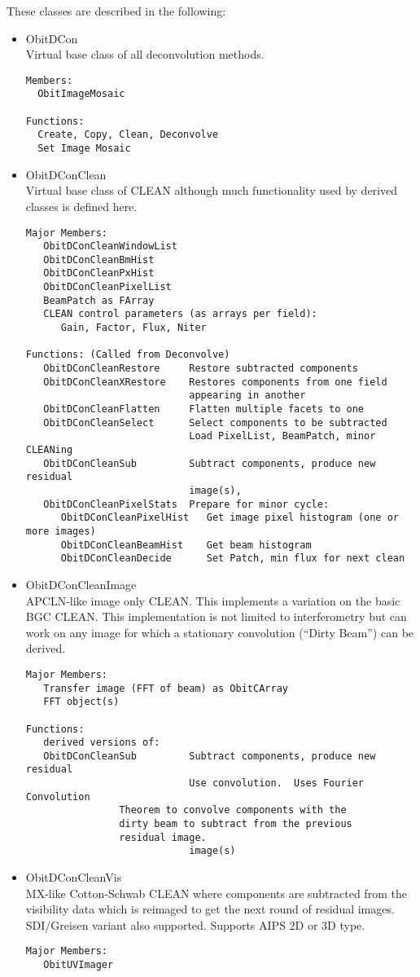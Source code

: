\documentclass[11pt]{article}
\begin{document}
These classes are described in the following:
\begin{itemize}
\item ObitDCon\\
Virtual base class of all deconvolution methods.
\begin{verbatim}
Members:
  ObitImageMosaic

Functions:
  Create, Copy, Clean, Deconvolve
  Set Image Mosaic
\end{verbatim}
\item ObitDConClean\\
Virtual base class of CLEAN although much functionality used by
derived classes is defined here.
\begin{verbatim}
Major Members:
   ObitDConCleanWindowList
   ObitDConCleanBmHist
   ObitDConCleanPxHist
   ObitDConCleanPixelList
   BeamPatch as FArray
   CLEAN control parameters (as arrays per field):
      Gain, Factor, Flux, Niter

Functions: (Called from Deconvolve)
   ObitDConCleanRestore     Restore subtracted components
   ObitDConCleanXRestore    Restores components from one field
                            appearing in another
   ObitDConCleanFlatten     Flatten multiple facets to one 
   ObitDConCleanSelect      Select components to be subtracted
                            Load PixelList, BeamPatch, minor CLEANing
   ObitDConCleanSub         Subtract components, produce new residual
                            image(s),
   ObitDConCleanPixelStats  Prepare for minor cycle:
      ObitDConCleanPixelHist   Get image pixel histogram (one or more images)
      ObitDConCleanBeamHist    Get beam histogram
      ObitDConCleanDecide      Set Patch, min flux for next clean
\end{verbatim}
\item ObitDConCleanImage\\
APCLN-like image only CLEAN.
This implements a variation on the basic BGC CLEAN.
This implementation is not limited to interferometry but can work on
any image for which a stationary convolution (``Dirty Beam'') can be
derived.
\begin{verbatim}
Major Members:
   Transfer image (FFT of beam) as ObitCArray
   FFT object(s)

Functions:
   derived versions of:
   ObitDConCleanSub         Subtract components, produce new residual
                            Use convolution.  Uses Fourier Convolution
			    Theorem to convolve components with the
			    dirty beam to subtract from the previous
			    residual image.
                            image(s)
\end{verbatim}
\item ObitDConCleanVis\\
MX-like Cotton-Schwab CLEAN where components are subtracted from the
visibility data which is reimaged to get the next round of residual
images. 
SDI/Greisen variant also supported.
Supports AIPS  2D or 3D  type.
\begin{verbatim}
Major Members:
   ObitUVImager


\end{verbatim}
\end{itemize}
\end{document}
